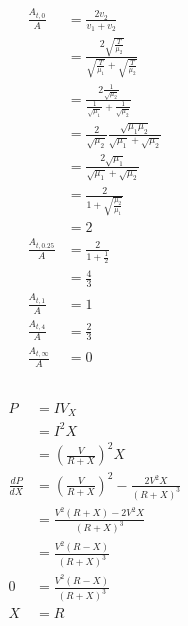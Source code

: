 \documentclass{article}
\begin{document}
\begin{align*}
  \frac{A_{t,0}}{A}      & = \frac{2 v_2}{v_1 + v_2}                                                          \\
                         & = \frac{2 \sqrt{\frac{T}{\mu_2}}}{\sqrt{\frac{T}{\mu_1}} + \sqrt{\frac{T}{\mu_2}}} \\
                         & = \frac{2 \frac{1}{\sqrt{\mu_2}}}{\frac{1}{\sqrt{\mu_1}} + \frac{1}{\sqrt{\mu_2}}} \\
                         & = \frac{2}{\sqrt{\mu_2}} \frac{\sqrt{\mu_1 \mu_2}}{\sqrt{\mu_1} + \sqrt{\mu_2}}    \\
                         & = \frac{2 \sqrt{\mu_1}}{\sqrt{\mu_1} + \sqrt{\mu_2}}                               \\
                         & = \frac{2}{1 + \sqrt{\frac{\mu_2}{\mu_1}}}                                         \\
                         & = 2                                                                                \\
  \frac{A_{t,0.25}}{A}   & = \frac{2}{1 + \frac{1}{2}}                                                        \\
                         & = \frac{4}{3}                                                                      \\
  \frac{A_{t,1}}{A}      & = 1                                                                                \\
  \frac{A_{t,4}}{A}      & = \frac{2}{3}                                                                      \\
  \frac{A_{t,\infty}}{A} & = 0
\end{align*}

\setcounter{subsection}{2}
\subsection{}

\begin{align*}
  P               & = I V_X                                                        \\
                  & = I^2 X                                                        \\
                  & = \left( \frac{V}{R + X} \right)^2 X                           \\
  \frac{d P}{d X} & = \left( \frac{V}{R + X} \right)^2 - \frac{2 V^2 X}{(R + X)^3} \\
                  & = \frac{V^2 (R + X) - 2 V^2 X}{(R + X)^3}                      \\
                  & = \frac{V^2 (R - X)}{(R + X)^3}                                \\
  0               & = \frac{V^2 (R - X)}{(R + X)^3}                                \\
  X               & = R
\end{align*}
\end{document}
